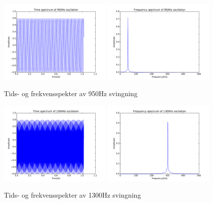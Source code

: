 \documentclass[12p,a4paper]{article}
\begin{document}
\begin{figure}[H]
\centering
\includegraphics[width=0.49\textwidth]{fig/timespec950.pdf}
\includegraphics[width=0.49\textwidth]{fig/freqspec950.pdf}
\caption{Tids- og frekvensspekter av 950Hz svingning}
\end{figure}
\begin{figure}[H]
\centering
\includegraphics[width=0.49\textwidth]{fig/timespec1300.pdf}
\includegraphics[width=0.49\textwidth]{fig/freqspec1300.pdf}
\caption{Tids- og frekvensspekter av 1300Hz svingning}
\label{fig:1300Hz}
\end{figure}
\end{document}

